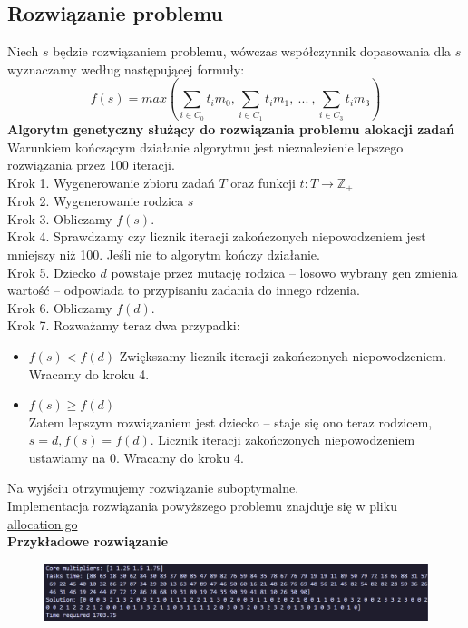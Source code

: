 \documentclass{article}
\begin{document}
    \subsection{Rozwiązanie problemu}
    Niech $s$ będzie rozwiązaniem problemu, wówczas współczynnik dopasowania dla $s$ wyznaczamy według następującej formuły:
    $$f(s)=max(\sum_{i\in C_0}t_im_0,\sum_{i\in C_1}t_im_1,\ ...\ ,\sum_{i\in C_3}t_im_3)$$
    \textbf{Algorytm genetyczny służący do rozwiązania problemu alokacji zadań}\\
    Warunkiem kończącym działanie algorytmu jest nieznalezienie lepszego rozwiązania przez 100 iteracji.\\
    Krok 1. Wygenerowanie zbioru zadań $T$ oraz funkcji $t:T\rightarrow \mathbb{Z_+}$\\
    Krok 2. Wygenerowanie rodzica $s$\\
    Krok 3. Obliczamy $f(s)$.\\
    Krok 4. Sprawdzamy czy licznik iteracji zakończonych niepowodzeniem jest mniejszy niż 100. Jeśli nie to algorytm kończy działanie.\\
    Krok 5. Dziecko $d$ powstaje przez mutację rodzica -- losowo wybrany gen zmienia wartość -- odpowiada to przypisaniu zadania do innego rdzenia.\\
    Krok 6. Obliczamy $f(d)$.\\
    Krok 7. Rozważamy teraz dwa przypadki:
    \begin{itemize}
    \item $f(s) < f(d)$
        Zwiększamy licznik iteracji zakończonych niepowodzeniem. Wracamy do kroku 4.
    \item $f(s)\geq f(d)$\\
        Zatem lepszym rozwiązaniem jest dziecko -- staje się ono teraz rodzicem, $s=d, f(s)=f(d)$. Licznik iteracji zakończonych niepowodzeniem ustawiamy na 0. Wracamy do kroku 4.
    \end{itemize}
    Na wyjściu otrzymujemy rozwiązanie suboptymalne.\\
    Implementacja rozwiązania powyższego problemu znajduje się w pliku \href{https://github.com/Kaniek99/AIbasics/blob/main/src/allocation/allocation.go}{allocation.go}\\
    \textbf{Przykładowe rozwiązanie}\\
    \begin{figure}[h]
    \includegraphics[width=\linewidth]{allocation_example.png}
    \end{figure}
\newpage
\end{document}
